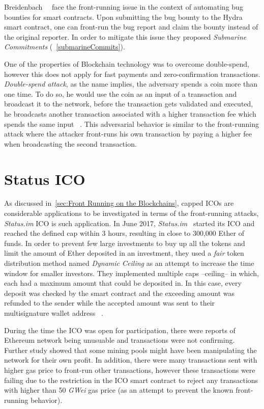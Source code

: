 Breidenbach~\etal~\cite{breidenbach2018enter} face the front-running issue in the context of automating bug bounties for smart contracts. Upon submitting the bug bounty to the Hydra smart contract, one can front-run the bug report and claim the bounty instead of the original reporter. In order to mitigate this issue they proposed \textit{Submarine Commitments} (~\ref{submarineCommits}).

One of the properties of Blockchain technology was to overcome double-spend, however this does not apply for fast payments and zero-confirmation transactions. \textit{Double-spend attack}, as the name implies, the adversary spends a coin more than one time. To do so, he would use the coin as an input of a transaction and broadcast it to the network, before the transaction gets validated and executed, he broadcasts another transaction associated with a higher transaction fee which spends the same input ~\cite{bamert2013have, karame2012double}. This adversarial behavior is similar to the front-running attack where the attacker front-runs his own transaction by paying a higher fee when broadcasting the second transaction.


\section{Status ICO} 
As discussed in~\ref{sec:Front Running on the Blockchains}, capped ICOs are considerable applications to be investigated in terms of the front-running attacks, \textit{Status.im} ICO is such application. In June 2017, \textit{Status.im}~\cite{statuswhitepaper} started its ICO and reached the defined cap within 3 hours, resulting in close to 300,000 Ether of funds. In order to prevent few large investments to buy up all the tokens and limit the amount of Ether deposited in an investment, they used a \textit{fair} token distribution method named \textit{Dynamic Ceiling} as an attempt to increase the time window for smaller investors. They implemented multiple caps --ceiling-- in which, each had a maximum amount that could be deposited in. In this case, every deposit was checked by the smart contract and the exceeding amount was refunded to the sender while the accepted amount was sent to their multisignature wallet address ~\cite{statusicoanalysis}. 

During the time the ICO was open for participation, there were reports of Ethereum network being unusuable and transactions were not confirming. Further study showed that some mining pools might have been manipulating the network for their own profit. In addition, there were many transactions sent with higher gas price to front-run other transactions, however these transactions were failing due to the restriction in the ICO smart contract to reject any transactions with higher than 50 \textit{GWei} gas price (as an attempt to prevent the known front-running behavior).

